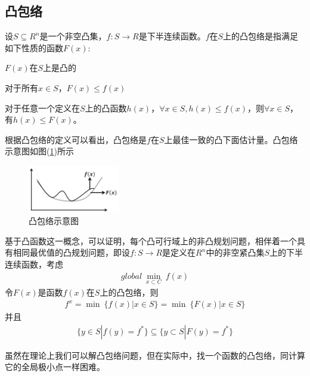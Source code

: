     \subsection{凸包络}
        \par
        \begin{definition}[凸包络]
        设$S \subseteq R^n$是一个非空凸集，$f:S\to R$是下半连续函数。$f$在$S$上的凸包络是指满足如下性质的函数$F(x)$:
        \par
        $F(x)$在$S$上是凸的
        \par
        对于所有$x\in S$，$F(x)\leqslant f(x)$
        \par
        对于任意一个定义在$S$上的凸函数$h(x)$，$\forall x\in S,h(x)\leqslant f(x)$，则$\forall x \in S$，有$h(x)\leqslant F(x)$。
        \end{definition}
        \par
        根据凸包络的定义可以看出，凸包络是$f$在$S$上最佳一致的凸下面估计量。凸包络示意图如图(\ref{fig:凸包络示意图})所示
       \begin{figure}[H]
        \centering
        \includegraphics[width=4cm]{images/Convex_envelope.jpg}
        \caption{凸包络示意图}
        \label{fig:凸包络示意图}
        \end{figure}
        \par
        基于凸函数这一概念，可以证明，每个凸可行域上的非凸规划问题，相伴着一个具有相同最优值的凸规划问题，即设$f:S\to R$是定义在$R^n$中的非空紧凸集$S$上的下半连续函数，考虑
        \begin{align*}
        {global}\ \mathop{\min}\limits_{x\subset C}\  f(x)
        \end{align*}
        令$F(x)$是函数$f(x)$在$S$上的凸包络，则
        \begin{align*}
        f^x={\min}\ \{ f(x)|x\in S\}={\min}\ \{F(x)|x\in S\}
        \end{align*}
        并且
        \begin{align*}
        \{ y\in S|f(y) =f^*\}\subseteq \{y\subset S|F(y)=f^*\}
        \end{align*}
        \par
        虽然在理论上我们可以解凸包络问题，但在实际中，找一个函数的凸包络，同计算它的全局极小点一样困难。
